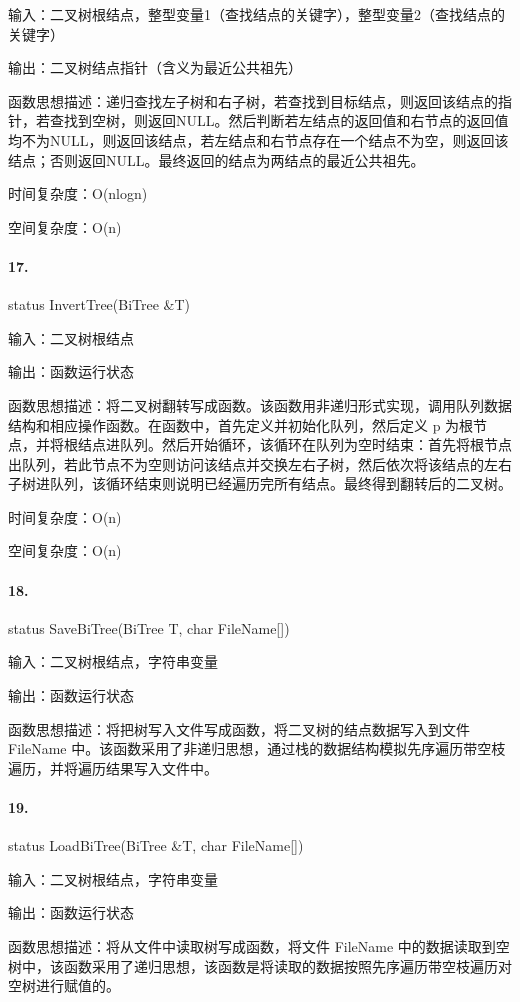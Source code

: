 \documentclass[supercite]{Experimental_Report}
\theoremstyle{definition}
\begin{document}
输入：二叉树根结点，整型变量1（查找结点的关键字），整型变量2（查找结点的关键字）

输出：二叉树结点指针（含义为最近公共祖先）

函数思想描述：递归查找左子树和右子树，若查找到目标结点，则返回该结点的指针，若查找到空树，则返回NULL。然后判断若左结点的返回值和右节点的返回值均不为NULL，则返回该结点，若左结点和右节点存在一个结点不为空，则返回该结点；否则返回NULL。最终返回的结点为两结点的最近公共祖先。

时间复杂度：O(nlogn)

空间复杂度：O(n)

\paragraph{17.}status InvertTree(BiTree \&T)

输入：二叉树根结点

输出：函数运行状态

函数思想描述：将二叉树翻转写成函数。该函数用非递归形式实现，调用队列数据结构和相应操作函数。在函数中，首先定义并初始化队列，然后定义 p 为根节点，并将根结点进队列。然后开始循环，该循环在队列为空时结束：首先将根节点出队列，若此节点不为空则访问该结点并交换左右子树，然后依次将该结点的左右子树进队列，该循环结束则说明已经遍历完所有结点。最终得到翻转后的二叉树。

时间复杂度：O(n)

空间复杂度：O(n)

\paragraph{18.}status SaveBiTree(BiTree T, char FileName[])

输入：二叉树根结点，字符串变量

输出：函数运行状态

函数思想描述：将把树写入文件写成函数，将二叉树的结点数据写入到文件 FileName 中。该函数采用了非递归思想，通过栈的数据结构模拟先序遍历带空枝遍历，并将遍历结果写入文件中。

\paragraph{19.}status LoadBiTree(BiTree \&T,  char FileName[])

输入：二叉树根结点，字符串变量

输出：函数运行状态

函数思想描述：将从文件中读取树写成函数，将文件 FileName 中的数据读取到空树中，该函数采用了递归思想，该函数是将读取的数据按照先序遍历带空枝遍历对空树进行赋值的。
\end{document}
